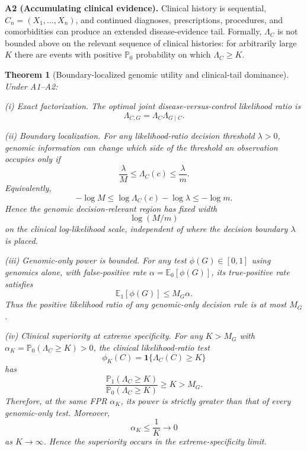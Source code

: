 \documentclass[journal]{IEEEtran}
\newtheorem{theorem}{Theorem}
\newcommand{\Pone}{\mathbb{P}_1}
\newcommand{\Pzero}{\mathbb{P}_0}
\newcommand{\Eone}{\mathbb{E}_1}
\newcommand{\Ezero}{\mathbb{E}_0}
\newcommand{\LR}{\Lambda}
\newcommand{\ind}{\mathbf{1}}
\begin{document}
\textbf{A2 (Accumulating clinical evidence).} Clinical history is sequential, $C_n=(X_1,\ldots,X_n)$, and continued diagnoses, prescriptions, procedures, and comorbidities can produce an extended disease-evidence tail. Formally, $\LR_C$ is not bounded above on the relevant sequence of clinical histories: for arbitrarily large $K$ there are events with positive $\Pzero$ probability on which $\LR_C\ge K$.

\begin{theorem}[Boundary-localized genomic utility and clinical-tail dominance]
\label{thm:main}
Under A1--A2:

\emph{(i) Exact factorization.} The optimal joint disease-versus-control likelihood ratio is
\begin{equation}
\LR_{C,G}=\LR_C\LR_{G\mid C}.
\end{equation}

\emph{(ii) Boundary localization.} For any likelihood-ratio decision threshold $\lambda>0$, genomic information can change which side of the threshold an observation occupies only if
\begin{equation}
\boxed{
\frac{\lambda}{M}
\le \LR_C(c)
\le \frac{\lambda}{m}.
}
\label{eq:boundaryband}
\end{equation}
Equivalently,
\begin{equation}
\boxed{
-\log M
\le
\log \LR_C(c)-\log\lambda
\le
-\log m.
}
\label{eq:logboundaryband}
\end{equation}
Hence the genomic decision-relevant region has fixed width
\begin{equation}
\log(M/m)
\end{equation}
on the clinical log-likelihood scale, independent of where the decision boundary $\lambda$ is placed.

\emph{(iii) Genomic-only power is bounded.} For any test $\phi(G)\in[0,1]$ using genomics alone, with false-positive rate $\alpha=\Ezero[\phi(G)]$, its true-positive rate satisfies
\begin{equation}
\boxed{
\Eone[\phi(G)]\le M_G\alpha.
}
\label{eq:genomicpowerbound}
\end{equation}
Thus the positive likelihood ratio of any genomic-only decision rule is at most $M_G$.

\emph{(iv) Clinical superiority at extreme specificity.} For any $K>M_G$ with $\alpha_K=\Pzero(\LR_C\ge K)>0$, the clinical likelihood-ratio test
\begin{equation}
\phi_K(C)=\ind\{\LR_C(C)\ge K\}
\end{equation}
has
\begin{equation}
\frac{\Pone(\LR_C\ge K)}{\Pzero(\LR_C\ge K)}\ge K>M_G.
\label{eq:clinicalLRplus}
\end{equation}
Therefore, at the same FPR $\alpha_K$, its power is strictly greater than that of every genomic-only test. Moreover,
\begin{equation}
\alpha_K\le \frac{1}{K}\to0
\end{equation}
as $K\to\infty$. Hence the superiority occurs in the extreme-specificity limit.


\end{theorem}
\end{document}
